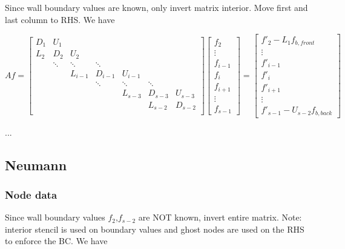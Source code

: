 \documentclass[11pt]{article}
\begin{document}
Since wall boundary values are known, only invert matrix interior. Move first and last column to RHS. We have

\[ Af = \left[
\begin{array}{ccccccccc}
D_{1} & U_{1}    &           &           &           &           &         \\
L_{2} & D_{2}    & U_{2}     &           &           &           &         \\
      & \ddots   & \ddots    & \ddots    &           &           &         \\
      &          & L_{i-1}   & D_{i-1}   & U_{i-1}   &           &         \\
      &          &           & \ddots    & \ddots    & \ddots    &         \\
      &          &           &           & L_{s-3}   & D_{s-3}   & U_{s-3} \\
      &          &           &           &           & L_{s-2}   & D_{s-2} \\
\end{array} \right] 
\left[ \begin{array}{c}
f_{2} \\ \vdots \\ f_{i-1} \\ f_{i} \\ f_{i+1} \\ \vdots \\ f_{s-1}
\end{array} \right]
=
\left[ \begin{array}{c}
f'_{2} - L_1 f_{b,front} \\ \vdots \\ 
f'_{i-1} \\ f'_{i} \\ f'_{i+1} \\ \vdots \\ f'_{s-1} - U_{s-2} f_{b,back}
\end{array} \right]
\]

...


\subsection{Neumann}

\subsubsection{Node data}

Since wall boundary values $f_2$,$f_{s-2}$ are NOT known, invert entire matrix. Note: interior stencil is used on boundary values and ghost nodes are used on the RHS to enforce the BC. We have
\end{document}
